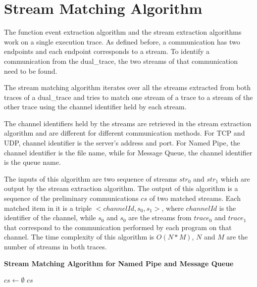 \section{Stream Matching Algorithm}\label{streammatch}
The function event extraction algorithm and the stream extraction algorithms work on a single execution trace. As defined before, a communication has two endpoints and each endpoint corresponds to a stream. To identify a communication from the dual\_trace, the two streams of that communication need to be found. 

The stream matching algorithm iterates over all the streams extracted from both traces of a dual\_trace and tries to match one stream of a trace to a stream of the other trace using the channel identifier held by each stream.

The channel identifiers held by the streams are retrieved in the stream extraction algorithm and are different for different communication methods. For TCP and UDP, channel identifier is the server's address and port. For Named Pipe, the channel identifier is the file name, while for Message Queue, the channel identifier is the queue name.  

 The inputs of this algorithm are two sequence of streams $str_0$ and $str_1$ which are output by the stream extraction algorithm. The output of this algorithm is a sequence of the preliminary communications $cs$ of two matched streams. Each matched item in it is a triple $<channelId, s_0, s_1>$, where $channelId$ is the identifier of the channel, while $s_0$ and $s_0$ are the streams from $trace_0$ and $trace_1$ that correspond to the communication performed by each program on that channel. The time complexity of this algorithm is $O(N*M)$, $N$ and $M$ are the number of streams in both traces.
 
 \begin{algorithm}[H]
\DontPrintSemicolon
\caption{{\bf Stream Matching Algorithm for Named Pipe and Message Queue} \label{matchAlg}}
$cs \leftarrow \emptyset$\; 
\KwRet $cs$\;
\end{algorithm} 

